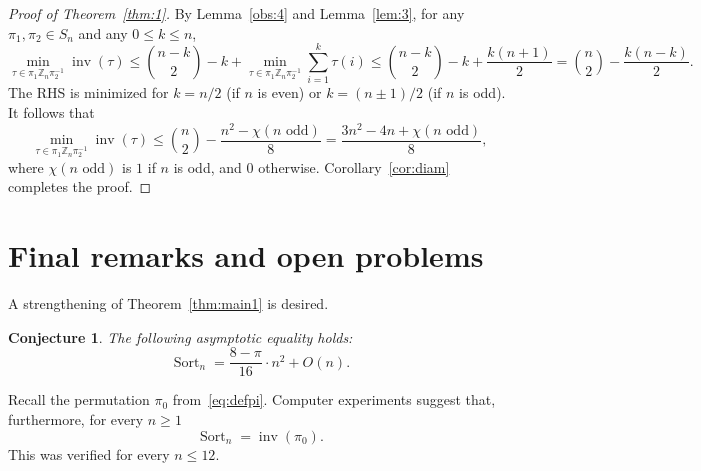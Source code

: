 \documentclass[11pt]{amsart}
\newtheorem{conjecture}[theorem]{Conjecture}
\numberwithin{equation}{section}
\newcommand{\todo}[1]{\vspace{5 mm}\par \noindent
\marginpar{\textsc{ToDo}} \framebox{\begin{minipage}[c]{0.95
\textwidth}
 #1 \end{minipage}}\vspace{5 mm}\par}
\newcommand{\ZZ}{{\mathbb {Z}}}
\newcommand{\inv}{{\operatorname{inv}}}
\newcommand{\dist}{{\operatorname{dist}}}
\newcommand{\Sort}{{\operatorname{Sort}}}
\begin{document}
\begin{proof}[Proof of Theorem~\ref{thm:1}] 
By Lemma~\ref{obs:4} and Lemma~\ref{lem:3}, for any $\pi_1, \pi_2 \in S_n$ and any $0 \le k \le n$,
\[
    \min_{\tau \in \pi_1 \ZZ_n \pi_2^{-1}} \inv(\tau)
    \le \binom{n-k}{2} - k + \min_{\tau \in \pi_1 \ZZ_n \pi_2^{-1}} \sum_{i=1}^{k} \tau(i)
    \le \binom{n-k}{2} - k + \frac{k(n+1)}{2}
    = \binom{n}{2} - \frac{k(n-k)}{2}.
\]
The RHS is minimized for $k = n/2$ (if $n$ is even) or $k = (n \pm 1)/2$ (if $n$ is odd). It follows that
\[
    \min_{\tau \in \pi_1 \ZZ_n \pi_2^{-1}} \inv(\tau)
    \le \binom{n}{2} - \frac{n^2 - \chi(n \text{ odd})}{8}
    = \frac{3n^2 - 4n + \chi(n \text{ odd})}{8},
\]
where $\chi(n \text{ odd})$ is $1$ if $n$ is odd, and $0$ otherwise. 
Corollary~\ref{cor:diam} completes the proof.
\end{proof}


\section{Final remarks and open problems}

A strengthening of Theorem~\ref{thm:main1} is desired. 


\begin{conjecture}\label{conj:0}
    The following asymptotic equality holds:
    \[
        \Sort_n
        = \frac{8-\pi}{16} \cdot n^2 + O(n).
    \]
\end{conjecture}

Recall the permutation $\pi_0$ from~\eqref{eq:defpi}. 
Computer experiments suggest that, furthermore, for every $n\ge 1$
\begin{equation}\label{eq:conj0}
\Sort_n=\inv(\pi_0).
\end{equation}
This was verified for every $n\le 12$. 
\end{document}
